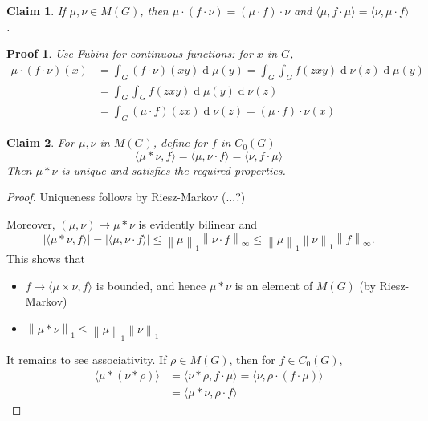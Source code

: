 \documentclass[11pt, a4paper]{memoir}
\newcommand{\norm}[1]{\ensuremath{\left\lVert#1\right\rVert}}
\theoremstyle{change}
\theoremstyle{plain}
\newtheorem{claim}{Claim}
\theoremstyle{nonumberplain}
\newtheorem{proof}{Proof}
\newtheorem{nmproof}{Proof}
\renewcommand{\d}[1]{\ensuremath{\operatorname{d}\!{#1}}}
\numberwithin{equation}{section}
\begin{document}
\begin{claim}
    If $\mu,\nu\in M(G)$, then $\mu\cdot(f\cdot\nu)=(\mu\cdot f)\cdot\nu$ and $\langle\mu,f\cdot\mu\rangle=\langle\nu,\mu\cdot f\rangle$.
\end{claim}
\begin{nmproof}
    Use Fubini for continuous functions: for $x$ in $G$,
    \begin{align*}
        \mu\cdot(f\cdot\nu)(x) &= \int_G(f\cdot\nu)(xy)\d{\mu(y)}= \int_G\int_Gf(zxy)\d{\nu(z)}\d{\mu(y)}\\
                               &= \int_G\int_G f(zxy)\d{\mu(y)}\d{\nu(z)}\\
                               &= \int_G(\mu\cdot f)(zx)\d{\nu(z)}=(\mu\cdot f)\cdot\nu(x)
    \end{align*}
\end{nmproof}
\begin{claim}
    For $\mu,\nu$ in $M(G)$, define for $f$ in $C_0(G)$
    \begin{equation*}
        \langle\mu*\nu,f\rangle=\langle\mu,\nu\cdot f\rangle=\langle\nu,f\cdot\mu\rangle
    \end{equation*}
    Then $\mu*\nu$ is unique and satisfies the required properties.
\end{claim}
\begin{proof}
    Uniqueness follows by Riesz-Markov (...?)

    Moreover, $(\mu,\nu)\mapsto\mu*\nu$ is evidently bilinear and
    \begin{equation*}
        |\langle\mu*\nu,f\rangle|=|\langle\mu,\nu\cdot f\rangle|\leq\norm{\mu}_1\norm{\nu\cdot f}_\infty\leq\norm{\mu}_1\norm{\nu}_1\norm{f}_\infty.
    \end{equation*}
    This shows that
    \begin{itemize}[nl]
        \item $f\mapsto\langle\mu\times\nu,f\rangle$ is bounded, and hence $\mu*\nu$ is an element of $M(G)$ (by Riesz-Markov)
        \item $\norm{\mu*\nu}_1\leq\norm{\mu}_1\norm{\nu}_1$
    \end{itemize}
    It remains to see associativity.
    If $\rho\in M(G)$, then for $f\in C_0(G)$,
    \begin{align*}
        \langle\mu*(\nu*\rho)\rangle&=\langle\nu*\rho,f\cdot\mu\rangle=\langle\nu,\rho\cdot(f\cdot\mu)\rangle\\
                                    &=\langle\mu*\nu,\rho\cdot f\rangle
    \end{align*}
\end{proof}
\end{document}
